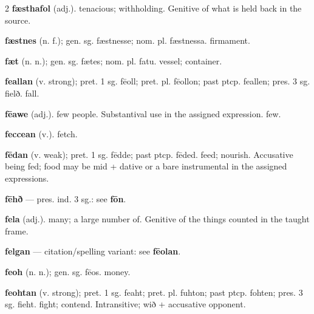 \begin{multicols*}{2}
\textbf{fæsthafol} (adj.). tenacious; withholding. Genitive of what is held back in the source.\par
\textbf{fæstnes} (n. f.); gen. sg. fæstnesse; nom. pl. fæstnessa. firmament.\par
\textbf{fæt} (n. n.); gen. sg. fætes; nom. pl. fatu. vessel; container.\par
\textbf{feallan} (v. strong); pret. 1 sg. fēoll; pret. pl. fēollon; past ptcp. feallen; pres. 3 sg. fielð. fall.\par
\textbf{fēawe} (adj.). few people. Substantival use in the assigned expression. few.\par
\textbf{feccean} (v.). fetch.\par
\textbf{fēdan} (v. weak); pret. 1 sg. fēdde; past ptcp. fēded. feed; nourish. Accusative being fed; food may be mid + dative or a bare instrumental in the assigned expressions.\par
\textbf{fēhð} — pres. ind. 3 sg.: see \textbf{fōn}.\par
\textbf{fela} (adj.). many; a large number of. Genitive of the things counted in the taught frame.\par
\textbf{felgan} — citation/spelling variant: see \textbf{fēolan}.\par
\textbf{feoh} (n. n.); gen. sg. fēos. money.\par
\textbf{feohtan} (v. strong); pret. 1 sg. feaht; pret. pl. fuhton; past ptcp. fohten; pres. 3 sg. fieht. fight; contend. Intransitive; wið + accusative opponent.\par

\end{multicols*}
